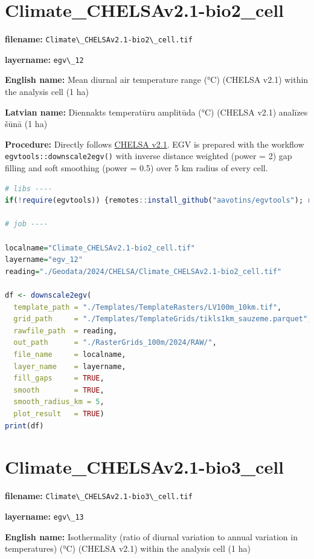 \documentclass[
]{book}
\newcommand{\passthrough}[1]{#1}
\begin{document}
\section{Climate\_CHELSAv2.1-bio2\_cell}\label{ch06.012}

\textbf{filename:} \passthrough{\lstinline!Climate\_CHELSAv2.1-bio2\_cell.tif!}

\textbf{layername:} \passthrough{\lstinline!egv\_12!}

\textbf{English name:} Mean diurnal air temperature range (°C) (CHELSA v2.1) within the analysis cell (1 ha)

\textbf{Latvian name:} Diennakts temperatūru amplitūda (°C) (CHELSA v2.1) analīzes šūnā (1 ha)

\textbf{Procedure:} Directly follows \hyperref[Ch04.11]{CHELSA v2.1}. EGV is prepared with the
workflow \passthrough{\lstinline!egvtools::downscale2egv()!} with inverse distance weighted (power = 2)
gap filling and soft smoothing (power = 0.5) over 5 km radius of every cell.

\begin{lstlisting}[language=R]
# libs ----
if(!require(egvtools)) {remotes::install_github("aavotins/egvtools"); require(egvtools)}

# job ----

localname="Climate_CHELSAv2.1-bio2_cell.tif"
layername="egv_12"
reading="./Geodata/2024/CHELSA/Climate_CHELSAv2.1-bio2_cell.tif"

df <- downscale2egv(
  template_path = "./Templates/TemplateRasters/LV100m_10km.tif",
  grid_path     = "./Templates/TemplateGrids/tikls1km_sauzeme.parquet",
  rawfile_path  = reading,
  out_path      = "./RasterGrids_100m/2024/RAW/",
  file_name     = localname,
  layer_name    = layername,
  fill_gaps     = TRUE,
  smooth        = TRUE,
  smooth_radius_km = 5,
  plot_result   = TRUE)
print(df)
\end{lstlisting}

\section{Climate\_CHELSAv2.1-bio3\_cell}\label{ch06.013}

\textbf{filename:} \passthrough{\lstinline!Climate\_CHELSAv2.1-bio3\_cell.tif!}

\textbf{layername:} \passthrough{\lstinline!egv\_13!}

\textbf{English name:} Isothermality (ratio of diurnal variation to annual variation in temperatures) (°C) (CHELSA v2.1) within the analysis cell (1 ha)
\end{document}
